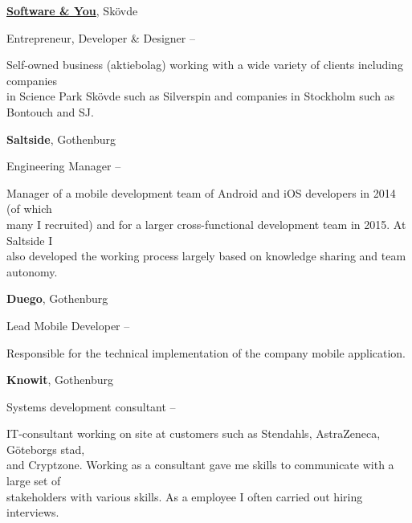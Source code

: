 \documentclass[letterpaper,MMMyyyy,nonstopmode]{simpleresumecv}
\begin{document}
\begin{Body}
\BigGap
\Entry
\href{http://softwareyou.se/}
{\textbf{Software \& You}}, Skövde

\Gap
\BulletItem
Entrepreneur, Developer \& Designer
\hfill
{} --
\begin{Detail}
\SubBulletItem
Self-owned business (aktiebolag) working with a wide variety of clients including companies\\in Science Park Skövde such as Silverspin and companies in Stockholm such as Bontouch and SJ. 
\end{Detail}

\newpage

\BigGap
\Entry
\textbf{Saltside}, Gothenburg

\Gap
\BulletItem
Engineering Manager
\hfill
{} --

\begin{Detail}
\SubBulletItem
Manager of a mobile development team of Android and iOS developers in 2014 (of which\\many I recruited) and for a larger cross-functional development team in 2015. At Saltside I\\also developed the working process largely based on knowledge sharing and team autonomy.
\end{Detail}

\BigGap
\Entry
\textbf{Duego}, Gothenburg

\Gap
\BulletItem
Lead Mobile Developer
\hfill
{} --

\begin{Detail}
\SubBulletItem
Responsible for the technical implementation of the company mobile application.
\end{Detail}

\BigGap
\Entry
\textbf{Knowit}, Gothenburg

\Gap
\BulletItem
Systems development consultant
\hfill
{} --

\begin{Detail}
\SubBulletItem
IT-consultant working on site at customers such as Stendahls, AstraZeneca, Göteborgs stad,\\and Cryptzone. Working as a consultant gave me skills to communicate with a large set of\\stakeholders with various skills. As a employee I often carried out hiring interviews.
\end{Detail}


\end{Body}
\end{document}
